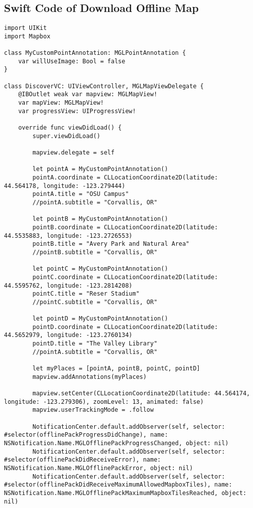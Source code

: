 \documentclass[letterpaper, 10pt,titlepage]{article}
\begin{document}
\subsection{Swift Code of Download Offline Map}
\begin{verbatim}
import UIKit
import Mapbox

class MyCustomPointAnnotation: MGLPointAnnotation {
    var willUseImage: Bool = false
}

class DiscoverVC: UIViewController, MGLMapViewDelegate {
    @IBOutlet weak var mapview: MGLMapView!
    var mapView: MGLMapView!
    var progressView: UIProgressView!
    
    override func viewDidLoad() {
        super.viewDidLoad()
        
        mapview.delegate = self
        
        let pointA = MyCustomPointAnnotation()
        pointA.coordinate = CLLocationCoordinate2D(latitude: 44.564178, longitude: -123.279444)
        pointA.title = "OSU Campus"
        //pointA.subtitle = "Corvallis, OR"
        
        let pointB = MyCustomPointAnnotation()
        pointB.coordinate = CLLocationCoordinate2D(latitude: 44.5535883, longitude: -123.2726553)
        pointB.title = "Avery Park and Natural Area"
        //pointB.subtitle = "Corvallis, OR"
        
        let pointC = MyCustomPointAnnotation()
        pointC.coordinate = CLLocationCoordinate2D(latitude: 44.5595762, longitude: -123.2814208)
        pointC.title = "Reser Stadium"
        //pointC.subtitle = "Corvallis, OR"
        
        let pointD = MyCustomPointAnnotation()
        pointD.coordinate = CLLocationCoordinate2D(latitude: 44.5652979, longitude: -123.2760134)
        pointD.title = "The Valley Library"
        //pointA.subtitle = "Corvallis, OR"
        
        let myPlaces = [pointA, pointB, pointC, pointD]
        mapview.addAnnotations(myPlaces)
        
        mapview.setCenter(CLLocationCoordinate2D(latitude: 44.564174, longitude: -123.279306), zoomLevel: 13, animated: false)
        mapview.userTrackingMode = .follow
          
        NotificationCenter.default.addObserver(self, selector: #selector(offlinePackProgressDidChange), name: NSNotification.Name.MGLOfflinePackProgressChanged, object: nil)
        NotificationCenter.default.addObserver(self, selector: #selector(offlinePackDidReceiveError), name: NSNotification.Name.MGLOfflinePackError, object: nil)
        NotificationCenter.default.addObserver(self, selector: #selector(offlinePackDidReceiveMaximumAllowedMapboxTiles), name: NSNotification.Name.MGLOfflinePackMaximumMapboxTilesReached, object: nil)
        

\end{verbatim}
\end{document}
